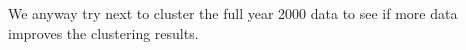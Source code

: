 We anyway try next to cluster the full year 2000 data to see if
more data improves the clustering results.


% 
% 



